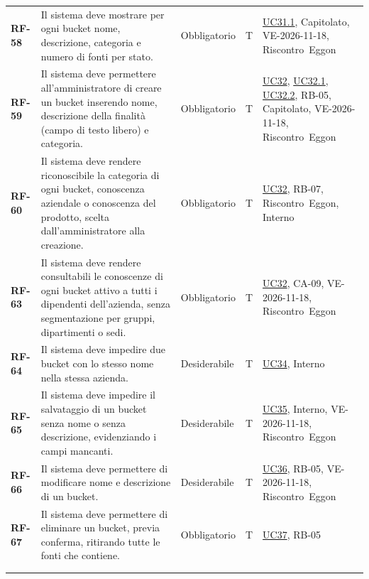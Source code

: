 \documentclass[documento]{gpt}
\begin{document}
{\begin{longtable}{@{}>{\raggedright\arraybackslash}p{1.35cm}>{\raggedright\arraybackslash}p{7.3cm}>{\raggedright\arraybackslash}p{1.9cm}>{\centering\arraybackslash}p{0.75cm}>{\raggedright\arraybackslash}p{3.1cm}@{}}
\leavevmode\hypertarget{req:RF-58}{\textbf{RF-58}} & Il sistema deve mostrare per ogni bucket nome, descrizione, categoria e numero di fonti per stato. & Obbligatorio & T & \hyperref[uc:bk_elem]{UC31.1}, \mbox{Capitolato}, \mbox{VE-2026-11-18}, \mbox{Riscontro Eggon} \\
\leavevmode\hypertarget{req:RF-59}{\textbf{RF-59}} & Il sistema deve permettere all’amministratore di creare un bucket inserendo nome, descrizione della finalità (campo di testo libero) e categoria. & Obbligatorio & T & \hyperref[uc:bk_crea]{UC32}, \hyperref[uc:bk_nome]{UC32.1}, \hyperref[uc:bk_desc]{UC32.2}, \mbox{RB-05}, \mbox{Capitolato}, \mbox{VE-2026-11-18}, \mbox{Riscontro Eggon} \\
\leavevmode\hypertarget{req:RF-60}{\textbf{RF-60}} & Il sistema deve rendere riconoscibile la categoria di ogni bucket, conoscenza aziendale o conoscenza del prodotto, scelta dall’amministratore alla creazione. & Obbligatorio & T & \hyperref[uc:bk_crea]{UC32}, \mbox{RB-07}, \mbox{Riscontro Eggon}, \mbox{Interno} \\
\leavevmode\hypertarget{req:RF-63}{\textbf{RF-63}} & Il sistema deve rendere consultabili le conoscenze di ogni bucket attivo a tutti i dipendenti dell’azienda, senza segmentazione per gruppi, dipartimenti o sedi. & Obbligatorio & T & \hyperref[uc:bk_crea]{UC32}, \mbox{CA-09}, \mbox{VE-2026-11-18}, \mbox{Riscontro Eggon} \\
\leavevmode\hypertarget{req:RF-64}{\textbf{RF-64}} & Il sistema deve impedire due bucket con lo stesso nome nella stessa azienda. & Desiderabile & T & \hyperref[uc:bk_nome_dup]{UC34}, \mbox{Interno} \\
\leavevmode\hypertarget{req:RF-65}{\textbf{RF-65}} & Il sistema deve impedire il salvataggio di un bucket senza nome o senza descrizione, evidenziando i campi mancanti. & Desiderabile & T & \hyperref[uc:bk_incompleto]{UC35}, \mbox{Interno}, \mbox{VE-2026-11-18}, \mbox{Riscontro Eggon} \\
\leavevmode\hypertarget{req:RF-66}{\textbf{RF-66}} & Il sistema deve permettere di modificare nome e descrizione di un bucket. & Desiderabile & T & \hyperref[uc:bk_modifica]{UC36}, \mbox{RB-05}, \mbox{VE-2026-11-18}, \mbox{Riscontro Eggon} \\
\leavevmode\hypertarget{req:RF-67}{\textbf{RF-67}} & Il sistema deve permettere di eliminare un bucket, previa conferma, ritirando tutte le fonti che contiene. & Obbligatorio & T & \hyperref[uc:bk_elimina]{UC37}, \mbox{RB-05} \\
\addlinespace[3pt]\multicolumn{5}{@{}l}{\textbf{\sffamily Gestione delle fonti}} \\ \addlinespace[2pt]

\end{longtable}}
\end{document}
